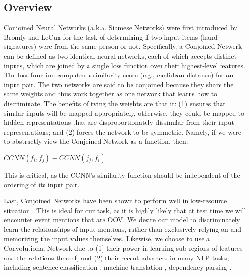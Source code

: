 \documentclass[11pt,a4paper]{article}
\begin{document}
\subsection{Overview}
Conjoined Neural Networks (a.k.a. Siamese Networks) were first introduced by Bromly and LeCun  for the task of determining if two input items (hand signatures) were from the same person or not.  Specifically, a Conjoined Network can be defined as two identical neural networks, each of which accepts distinct inputs, which are joined by a single loss function over their highest-level features.  The loss function computes a similarity score (e.g., euclidean distance) for an input pair.  The two networks are said to be conjoined because they share the same weights and thus work together as one network that learns how to discriminate.  The benefits of tying the weights are that it: (1) ensures that similar inputs will be mapped appropriately, otherwise, they could be mapped to hidden representations that are disproportionately dissimilar from their input representations; and (2) forces the network to be symmetric.  Namely, if we were to abstractly view the Conjoined Network as a function, then:

\vspace{4mm}

 $CCNN(f_i,f_j) \equiv CCNN(f_j,f_i)$

\vspace{4mm}

This is critical, as the CCNN's similarity function should be independent of the ordering of its input pair.

Last, Conjoined Networks have been shown to perform well in low-resource situation \cite{Koch2015SiameseNN}.  This is ideal for our task, as it is highly likely that at test time we will encounter event mentions that are OOV.  We desire our model to discriminately learn the relationships of input mentions, rather than exclusively relying on and memorizing the input values themselves.  Likewise, we choose to use a Convolutional Network due to (1) their power in learning sub-regions of features and the relations thereof, and (2) their recent advances in many NLP tasks, including sentence classification \cite{DBLP:conf/emnlp/Kim14}, machine translation \cite{DBLP:conf/acl/GehringAGD17}, dependency parsing \cite{DBLP:journals/corr/YuV17}.

\end{document}
